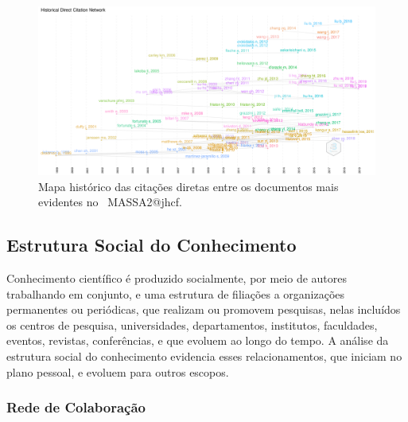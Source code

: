 \begin{figure}
    \centering
    \includegraphics[width=1\textwidth]{experiments/jhcf/PesqBibliogr/SimulacaoMultiagente/WoS-20220203/Estrutura/Intelectual/MASSA2-HistoricalDirectCitationNetwork-100docs.png}
    \caption{Mapa histórico das citações diretas entre os documentos mais evidentes no  \dataset\ MASSA2@jhcf.}
    \label{fig:MASSA2-HistoricalDirectCitationNetwork-100docs}
\end{figure}

\subsection{Estrutura Social  do Conhecimento}

Conhecimento científico é produzido socialmente, por meio de autores trabalhando em conjunto, e uma estrutura de filiações a organizações permanentes ou periódicas, que realizam ou promovem pesquisas, nelas incluídos os centros de pesquisa, universidades, departamentos, institutos, faculdades, eventos, revistas, conferências, e que evoluem ao longo do tempo. A análise da estrutura social do conhecimento evidencia esses relacionamentos, que iniciam no plano pessoal, e evoluem para outros escopos.

\subsubsection{Rede de Colaboração}


